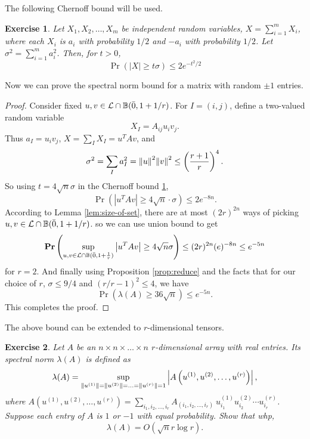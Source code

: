 \documentclass{book}
\newtheorem{exercise}{Exercise}
\numberwithin{exercise}{chapter}
\begin{document}
The following Chernoff bound will be used.
\begin{exercise} \label{ex:chernoff}
Let $X_{1}, X_{2}, \ldots, X_{m}$ be independent random variables, $X=\sum_{i=1}^m X_i$,
where each $X_i$ is $a_i$ with probability $1/2$ and $-a_i$ with probability $1/2$. Let $\sigma^2 = \sum_{i=1}^m a_i^2$.
Then, for $t > 0$,
\[
\Pr \left( \left| X \right| \geq t\sigma \right) \leq 2 e^{-t^{2}/2}
\]
\end{exercise}

Now we can prove the spectral norm bound for a matrix with random $\pm 1$ entries.

\begin{proof}

Consider fixed $u,v \in {\cal L} \cap
\mathbb{B}(\bar{0}, 1 + 1/r)$. For $I = (i,j)$,
define a two-valued random variable
\[
X_{I} = A_{ij} u_{i}v_{j}.
\]
Thus $a_{I} = u_i v_j$, $X  = \sum_{I} X_{I} = u^TAv $, and
\[
\sigma^2 = \sum_{I} a_{I}^{2} = {\| u \|}^{2}{\| v \|}^{2}
 \le \left(\frac{r+1}{r} \right)^{4}.
\]
So using $t = 4\sqrt{n}\sigma$ in
the Chernoff bound \ref{ex:chernoff},
\[
\Pr \left( \left| u^TAv\right| \geq 4\sqrt{n} \cdot \sigma \right) \leq
2e^{-8n}.
\]
According to Lemma \ref{lem:size-of-set}, there are at most
$(2r)^{2n}$ ways of picking $u,v \in {\cal L} \cap \mathbb{B}(\bar{0}, 1 + 1/r)$.  so we can use union bound to get
\[
\mbox{{\bf Pr}} \left( \sup_{u,v \in {\cal L} \cap
\mathbb{B}(\bar{0}, 1 + \frac{1}{r})} \left| u^TAv \right| \geq 4\sqrt{n}\sigma \right) \leq (2r)^{2n} (e)^{-8n} \le e^{-5n}
\]
for $r = 2$.
And finally using Proposition \ref{prop:reduce} and the facts that for our choice of $r$, $\sigma \le 9/4$ and $(r/r-1)^2 \le 4$, we have
\[
\Pr \left( \lambda(A) \geq 36\sqrt{n} \right)
\leq e^{-5n}.
\]
This completes the proof.
\end{proof}

The above bound can be extended to $r$-dimensional tensors.

\begin{exercise}\label{tensor-norm}
Let $A$ be an $n \times n \times \ldots \times n$ $r$-dimensional array with
real entries. Its spectral norm $\lambda(A)$ is defined as
\[
\lambda(A) = \sup_{{\| u^{(1)} \|} = {\| u^{(2)} \|} = \ldots =
{\| u^{(r)} \|} = 1} \left| A \left( u^{(1)}, u^{(2)}, \ldots,
u^{(r)} \right) \right|,
\]
where $A \left( u^{(1)}, u^{(2)}, \ldots, u^{(r)} \right) =
\sum_{i_{1}, i_{2}, \ldots, i_{r}} A_{(i_{1}, i_{2}, \ldots,
i_{r})}~ u^{(1)}_{i_{1}} u^{(2)}_{i_{2}} \cdots u^{(r)}_{i_{r}}$.
Suppose each entry of $A$ is $1$ or $-1$ with equal probability. Show that whp,
\begin{equation}
\lambda(A) = O(\sqrt{n}r \log r).
\end{equation}
\end{exercise}
\end{document}
